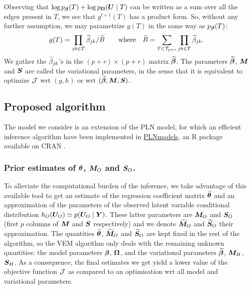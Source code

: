 Observing that $\log p_{\boldsymbol{\beta}}(T) + \log p_{{\boldsymbol{\Omega}}}({\boldsymbol{U}} \mid T)$ can be written as a sum over all the edges present in $T$, we see that $g^{t+1}(T)$ has a product form. So, without any further assumption, we may parametrize $g(T)$ in the same way as $p_{\boldsymbol{\beta}}(T)$:
\begin{equation} \label{eq:g}
g(T) = \prod_{jk \in T} {\widetilde{\beta}}_{jk} / {\widetilde{B}}
\qquad \text{where} \quad
{\widetilde{B}} = \sum_{T \in {\mathcal{T}}_{p+r}} \prod_{jk \in T} {\widetilde{\beta}}_{jk}.
\end{equation}
We gather the ${\widetilde{\beta}}_{jk}$'s in the $(p+r) \times (p+r)$ matrix ${\widetilde{{\boldsymbol{\beta}}}}$. The parameters ${\widetilde{{\boldsymbol{\beta}}}}$, ${\boldsymbol{M}}$ and ${\boldsymbol{S}}$ are called the variational parameters, in the sense that it is equivalent to optimize ${\mathcal{J}}$ wrt $(g, h)$ or wrt $({\widetilde{{\boldsymbol{\beta}}}}, {\boldsymbol{M}}, {\boldsymbol{S}})$.

\subsection{Proposed algorithm}
\label{algo}

The model we consider is an extension of the PLN model, for which an efficient inference algorithm have been implemented in \url{PLNmodels}, an R package available on CRAN \citep{CMR18,CMR19}. 

\subsubsection*{Prior estimates of ${\boldsymbol{\theta}}$, ${\boldsymbol{M}}_O$ and ${\boldsymbol{S}}_O$.}
To alleviate the computational burden of the inference, we take advantage of this available tool to get an estimate of the regression coefficient matrix $\widehat{{\boldsymbol{\theta}}}$ and an approximation of the parameters  of the observed latent variable conditional distribution $h_O({\boldsymbol{U}}_O) \simeq p({\boldsymbol{U}}_O \mid {\boldsymbol{Y}})$. These latter parameters are ${\boldsymbol{M}}_O$ and ${\boldsymbol{S}}_O$ (first $p$  columns of ${\boldsymbol{M}}$ and ${\boldsymbol{S}}$ respectively) and we denote ${\widetilde{{\boldsymbol{M}}}}_O$ and ${\widetilde{{\boldsymbol{S}}}}_O$ their approximation. The quantities $\widehat{{\boldsymbol{\theta}}}$, ${\widetilde{{\boldsymbol{M}}}}_O$ and ${\widetilde{{\boldsymbol{S}}}}_O$ are kept fixed in the rest of the algorithm, so the VEM algorithm only deals with the remaining unknown quantities: the model parameters ${\boldsymbol{\beta}}$, ${\boldsymbol{\Omega}}$, and the variational parameters ${\widetilde{{\boldsymbol{\beta}}}}$, ${\boldsymbol{M}}_H$, ${\boldsymbol{S}}_H$. 
As a consequence, the final estimates we get yield a lower value of the objective function ${\mathcal{J}}$ as compared to  an optimisation wrt all model and variational parameters.

